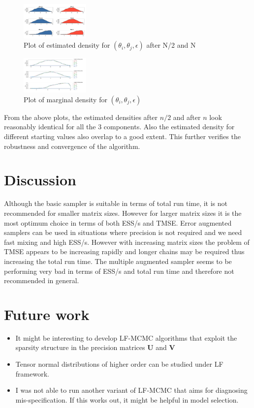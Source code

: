 \begin{multicols}{2}
\begin{figure}[H]
  \centering
    \includegraphics[width=0.30\textwidth]{plot6.jpeg}
    \caption{Plot of estimated density for $(\theta_i,\theta_j,\epsilon)$ after N/2 and N}
    \label{BN}
\end{figure}

\begin{figure}[H]
  \centering
    \includegraphics[width=0.30\textwidth]{plot7.jpeg}
    \caption{Plot of marginal density for $(\theta_i,\theta_j,\epsilon)$}
    \label{BN}
\end{figure}

From the above plots, the estimated densities after $n/2$ and after $n$ look reasonably identical for all the $3$ components. Also the estimated density for different starting values also overlap to a good extent. This further verifies the robustness and convergence of the algorithm.

\section{Discussion}
Although the basic sampler is suitable in terms of total run time, it is not recommended for smaller matrix sizes. However for larger matrix sizes it is the most optimum choice in terms of both ESS/s and TMSE. Error augmented samplers can be used in situations where precision is not required and we need fast mixing and high ESS/s. However with increasing matrix sizes the problem of TMSE appears to be increasing rapidly and longer chains may be required thus increasing the total run time. The multiple augmented sampler seems to be performing very bad in terms of ESS/s and total run time and therefore not recommended in general.
\section{Future work}
\begin{itemize}
\item It might be interesting to develop LF-MCMC algorithms that exploit the sparsity structure in the precision matrices $\mathbf{U}$ and $\mathbf{V}$
\item Tensor normal distributions of higher order can be studied under LF framework. 
\item I was not able to run another variant of LF-MCMC that aims for diagnosing mis-specification. If this works out, it might be helpful in model selection. 
\end{itemize}

{}
 

\end{multicols}

